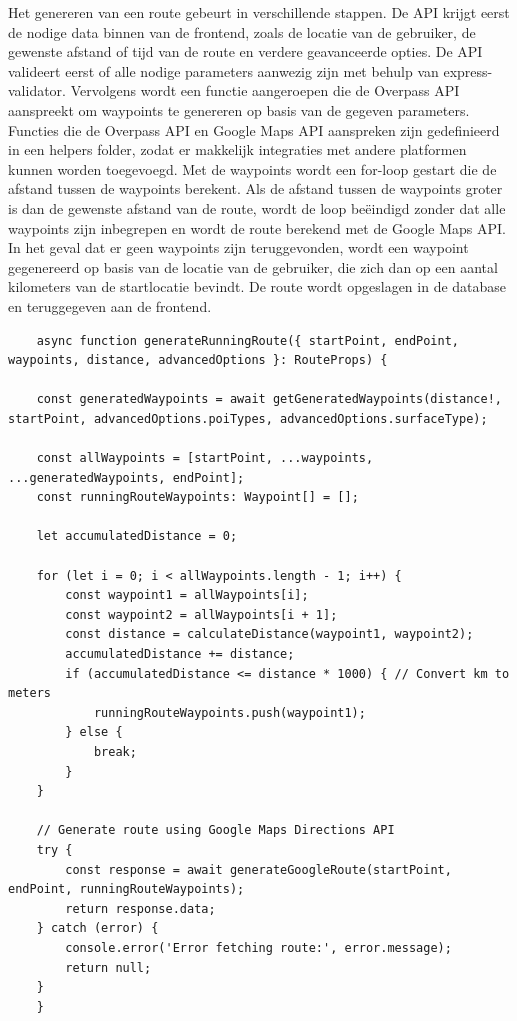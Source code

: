     Het genereren van een route gebeurt in verschillende stappen. De API krijgt eerst de nodige data binnen van de frontend, zoals de locatie van de gebruiker, de gewenste afstand of tijd van de route en verdere geavanceerde opties. De API valideert eerst of alle nodige parameters aanwezig zijn met behulp van express-validator. Vervolgens wordt een functie aangeroepen die de Overpass API aanspreekt om waypoints te genereren op basis van de gegeven parameters. Functies die de Overpass API en Google Maps API aanspreken zijn gedefinieerd in een helpers folder, zodat er makkelijk integraties met andere platformen kunnen worden toegevoegd. Met de waypoints wordt een for-loop gestart die de afstand tussen de waypoints berekent. Als de afstand tussen de waypoints groter is dan de gewenste afstand van de route, wordt de loop beëindigd zonder dat alle waypoints zijn inbegrepen en wordt de route berekend met de Google Maps API. In het geval dat er geen waypoints zijn teruggevonden, wordt een waypoint gegenereerd op basis van de locatie van de gebruiker, die zich dan op een aantal kilometers van de startlocatie bevindt. De route wordt opgeslagen in de database en teruggegeven aan de frontend.

    \pagebreak

\begin{lstlisting}
    async function generateRunningRoute({ startPoint, endPoint, waypoints, distance, advancedOptions }: RouteProps) {

    const generatedWaypoints = await getGeneratedWaypoints(distance!, startPoint, advancedOptions.poiTypes, advancedOptions.surfaceType);

    const allWaypoints = [startPoint, ...waypoints, ...generatedWaypoints, endPoint];
    const runningRouteWaypoints: Waypoint[] = [];

    let accumulatedDistance = 0;

    for (let i = 0; i < allWaypoints.length - 1; i++) {
        const waypoint1 = allWaypoints[i];
        const waypoint2 = allWaypoints[i + 1];
        const distance = calculateDistance(waypoint1, waypoint2);
        accumulatedDistance += distance;
        if (accumulatedDistance <= distance * 1000) { // Convert km to meters
            runningRouteWaypoints.push(waypoint1);
        } else {
            break;
        }
    }

    // Generate route using Google Maps Directions API
    try {
        const response = await generateGoogleRoute(startPoint, endPoint, runningRouteWaypoints);
        return response.data;
    } catch (error) {        
        console.error('Error fetching route:', error.message);
        return null;
    }
    }
\end{lstlisting}

    